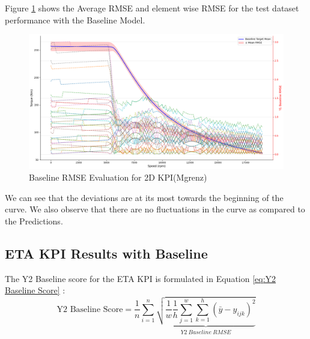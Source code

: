 \documentclass{report} %
\begin{document}
\vspace{1em} %

Figure \ref{fig:Baseline RMSE Evaluation for 2D KPI(Mgrenz)} shows the Average \ac{RMSE} and element wise \ac{RMSE} for the test dataset performance with the Baseline Model.\\

\begin{figure}[H]
    \centering
    \includegraphics[width=1\textwidth]{./ReportImages/RMSE_Baseline_y1.png} 
    \caption{Baseline \ac{RMSE} Evaluation for 2D KPI(Mgrenz)} 
    \label{fig:Baseline RMSE Evaluation for 2D KPI(Mgrenz)}
\end{figure}

We can see that the deviations are at its most towards the beginning of the curve. 
We also observe that there are no fluctuations in the curve as compared to the Predictions.\\

\subsection{ETA \ac{KPI} Results with Baseline}\label{sec:3D ETA Grid Results with Baseline}

The Y2 Baseline score for the ETA \ac{KPI} is formulated in Equation \ref{eq:Y2 Baseline Score} :
\begin{equation}
    \text{Y2 Baseline Score} = \frac{1}{n} \sum_{i=1}^{n} \underbrace{ \sqrt{\frac{1}{w} \frac{1}{h} \sum_{j=1}^{w} \sum_{k=1}^{h} (\bar{y} - y_{ijk})^2}}_{Y2\ Baseline\ RMSE}
    \label{eq:Y2 Baseline Score}
\end{equation}
    

\end{document}
